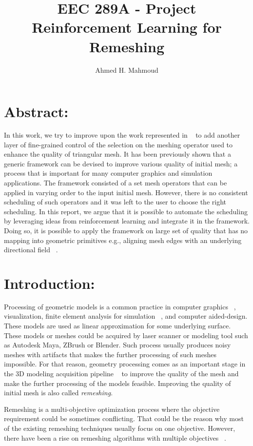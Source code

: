 \documentclass[a4paper,10pt]{article}
\title{EEC 289A - Project \\ Reinforcement Learning for Remeshing}
\author{Ahmed H. Mahmoud}
\date{}
\begin{document}
\maketitle

\section{Abstract:}
In this work, we try to improve upon the work represented in ~\citep{Abdelkader:2017:ACR} to add another layer of fine-grained control of the selection on the meshing operator used to enhance the quality of triangular mesh. It has been previously shown that a generic framework can be devised to improve various quality of initial mesh; a process that is important for many computer graphics and simulation applications. The framework consisted of a set mesh operators that can be applied in varying order to the input initial mesh. However, there is no consistent scheduling of such operators and it was left to the user to choose the right scheduling. In this report, we argue that it is possible to automate the scheduling by leveraging ideas from reinforcement learning and integrate it in the framework. Doing so, it is possible to apply the framework on large set of quality that has no mapping into geometric primitives e.g., aligning mesh edges with an underlying directional field ~\cite{Jakob:2015:IFM:2816795.2818078}. 


\section{Introduction:}
Processing of geometric models is a common practice in computer graphics ~\citep{Alliez2008}, visualization, finite element analysis for simulation ~\citep{ho1988finite}, and computer aided-design. These models are used as linear approximation for some underlying surface. These models or meshes could be acquired by laser scanner or modeling tool such as Autodesk Maya, ZBrush or Blender. Such process usually produces noisy meshes with artifacts that makes the further processing of such meshes impossible. For that reason, geometry processing comes as an important stage in the 3D modeling acquisition pipeline ~\citep{CGF:CGF00574} to improve the quality of the mesh and make the further processing of the models feasible. Improving the quality of initial mesh is also called \emph{remeshing}.

Remeshing is a multi-objective optimization process where the objective requirement could be sometimes conflicting. That could be the reason why most of the existing remeshing techniques usually focus on one objective. However, there have been a rise on remeshing algorithms with multiple objectives ~\citep{7756294, field, Jakob:2015:IFM:2816795.2818078}. 
\end{document}
